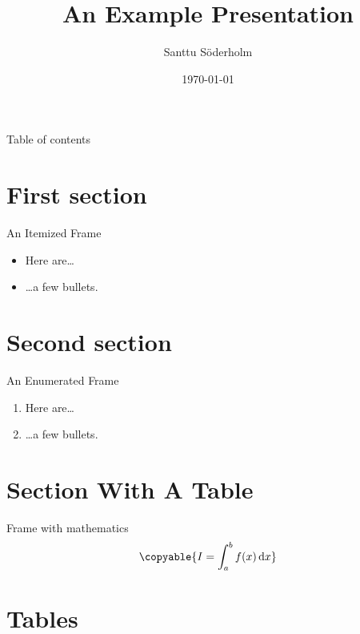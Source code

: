 \documentclass[tikz]{beamer}
\title{An Example Presentation}
\date{\today}
\author[Söderholm]{Santtu Söderholm}
\begin{document}
\begin{frame}
\titlepage
\end{frame}

\begin{frame}{Table of contents}
\tableofcontents
\end{frame}

\section{First section}

\begin{frame}{An Itemized Frame}
\begin{itemize}
\item Here are\ldots
\item \ldots a few bullets.
\end{itemize}
\end{frame}

\section{Second section}

\begin{frame}{An Enumerated Frame}
\begin{enumerate}
\item Here are\ldots
\item \ldots a few bullets.
\end{enumerate}
\end{frame}

\section{Section With A Table}

\begin{frame}{Frame with mathematics}
\begin{equation}
  \copyable{
    I = \int_a^b f(x) \,\mathrm d x
  }
\end{equation}
\end{frame}

\section{Tables}
\end{document}
